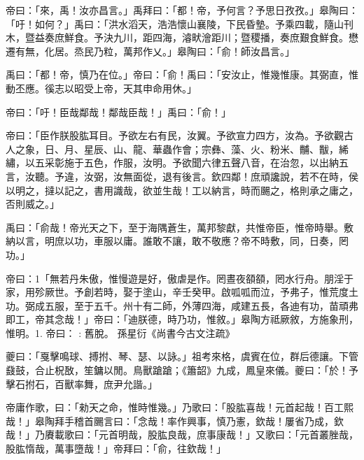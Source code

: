 
\begin{pinyinscope}
帝曰：「來，禹！汝亦昌言。」禹拜曰：「都！帝，予何言？予思日孜孜。」皋陶曰：「吁！如何？」禹曰：「洪水滔天，浩浩懷山襄陵，下民昏墊。予乘四載，隨山刊木，暨益奏庶鮮食。予決九川，距四海，濬畎澮距川；暨稷播，奏庶艱食鮮食。懋遷有無，化居。烝民乃粒，萬邦作乂。」皋陶曰：「俞！師汝昌言。」

禹曰：「都！帝，慎乃在位。」帝曰：「俞！禹曰：「安汝止，惟幾惟康。其弼直，惟動丕應。徯志以昭受上帝，天其申命用休。」

帝曰：「吁！臣哉鄰哉！鄰哉臣哉！」禹曰：「俞！」

帝曰：「臣作朕股肱耳目。予欲左右有民，汝翼。予欲宣力四方，汝為。予欲觀古人之象，日、月、星辰、山、龍、華蟲作會；宗彝、藻、火、粉米、黼、黻，絺繡，以五采彰施于五色，作服，汝明。予欲聞六律五聲八音，在治忽，以出納五言，汝聽。予違，汝弼，汝無面從，退有後言。欽四鄰！庶頑讒說，若不在時，侯以明之，撻以記之，書用識哉，欲並生哉！工以納言，時而颺之，格則承之庸之，否則威之。」

禹曰：「俞哉！帝光天之下，至于海隅蒼生，萬邦黎獻，共惟帝臣，惟帝時舉。敷納以言，明庶以功，車服以庸。誰敢不讓，敢不敬應？帝不時敷，同，日奏，罔功。」

帝曰：1「無若丹朱傲，惟慢遊是好，傲虐是作。罔晝夜頟頟，罔水行舟。朋淫于家，用殄厥世。予創若時，娶于塗山，辛壬癸甲。啟呱呱而泣，予弗子，惟荒度土功。弼成五服，至于五千。州十有二師，外薄四海，咸建五長，各迪有功，苗頑弗即工，帝其念哉！」帝曰：「迪朕德，時乃功，惟敘。」皋陶方祗厥敘，方施象刑，惟明。1. 帝曰： : 舊脫。 孫星衍《尚書今古文注疏》

夔曰：「戛擊鳴球、搏拊、琴、瑟、以詠。」祖考來格，虞賓在位，群后德讓。下管鼗鼓，合止柷敔，笙鏞以閒。鳥獸蹌蹌；《簫韶》九成，鳳皇來儀。夔曰：「於！予擊石拊石，百獸率舞，庶尹允諧。」

帝庸作歌，曰：「勑天之命，惟時惟幾。」乃歌曰：「股肱喜哉！元首起哉！百工熙哉！」皋陶拜手稽首颺言曰：「念哉！率作興事，慎乃憲，欽哉！屢省乃成，欽哉！」乃賡載歌曰：「元首明哉，股肱良哉，庶事康哉！」又歌曰：「元首叢脞哉，股肱惰哉，萬事墮哉！」帝拜曰：「俞，往欽哉！」


\end{pinyinscope}
